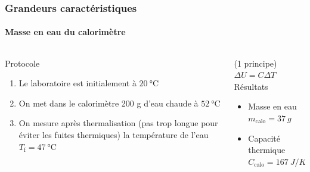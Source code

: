 \documentclass[a4paper,11pt]{beamer}
\newcommand{\cel}{\degreeCelsius}
\begin{document}
\begin{frame}
    \frametitle{Grandeurs caractéristiques}
    \framesubtitle{Masse en eau du calorimètre}

    \begin{columns}
        \begin{column}{0.5\textwidth}
            Protocole
            \begin{enumerate}
                \item Le laboratoire est initialement à $\SI{20}{\cel}$
                \item On met dans le calorimètre 200 g d'eau chaude à $\SI{52}{\cel}$
                \item On mesure après thermalisation (pas trop longue pour éviter les fuites thermiques) la température de l'eau $T_\text{f} = \SI{47}{\cel}$
            \end{enumerate}
        \end{column}
        \vrule{}
        \begin{column}{0.5\textwidth}
            (1\ier{} principe) $\Delta U = C \Delta T$
            Résultats
            \begin{itemize}
                \item Masse en eau $m_\text{calo} = \SI{37}{g}$
                \item Capacité thermique $C_\text{calo} = \SI{167}{J/K}$
            \end{itemize}
        \end{column}
    \end{columns}
\end{frame}
\end{document}
